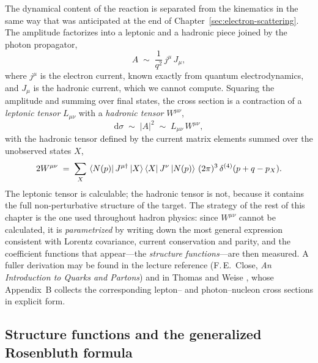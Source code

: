 The dynamical content of the reaction is separated from the kinematics in the same way
that was anticipated at the end of Chapter~\ref{sec:electron-scattering}. The amplitude
factorizes into a leptonic and a hadronic piece joined by the photon propagator,
\begin{equation}
    A \;\sim\; \frac{1}{q^{2}}\,j^{\mu}\,J_{\mu},
\end{equation}
where $j^{\mu}$ is the electron current, known exactly from quantum electrodynamics, and
$J_{\mu}$ is the hadronic current, which we cannot compute. Squaring the amplitude and
summing over final states, the cross section is a contraction of a \emph{leptonic
tensor} $L_{\mu\nu}$ with a \emph{hadronic tensor} $W^{\mu\nu}$,
\begin{equation}
    \mathrm{d}\sigma \;\sim\; |A|^{2} \;\sim\; L_{\mu\nu}\,W^{\mu\nu},
\end{equation}
with the hadronic tensor defined by the current matrix elements summed over the
unobserved states $X$,
\begin{equation}
    2W^{\mu\nu} \;=\; \sum_{X}\,
    \bra{N(p)} J^{\mu\dagger} \ket{X}\bra{X} J^{\nu} \ket{N(p)}\,
    (2\pi)^{3}\,\delta^{(4)}(p+q-p_{X}).
    \label{eq:hadronic-tensor}
\end{equation}
The leptonic tensor is calculable; the hadronic tensor is not, because it contains the
full non-perturbative structure of the target. The strategy of the rest of this chapter
is the one used throughout hadron physics: since $W^{\mu\nu}$ cannot be calculated, it
is \emph{parametrized} by writing down the most general expression consistent with
Lorentz covariance, current conservation and parity, and the coefficient functions that
appear---the \emph{structure functions}---are then measured. A fuller derivation may be
found in the lecture reference (F.\,E.\ Close, \emph{An Introduction to Quarks and
Partons}) and in Thomas and Weise \cite[Ch.~4]{ThomasWeise2001}, whose Appendix~B
collects the corresponding lepton-- and photon--nucleon cross sections in explicit
form.

\FloatBarrier

\subsection{Structure functions and the generalized Rosenbluth formula}
\label{subsec:structure-functions}

